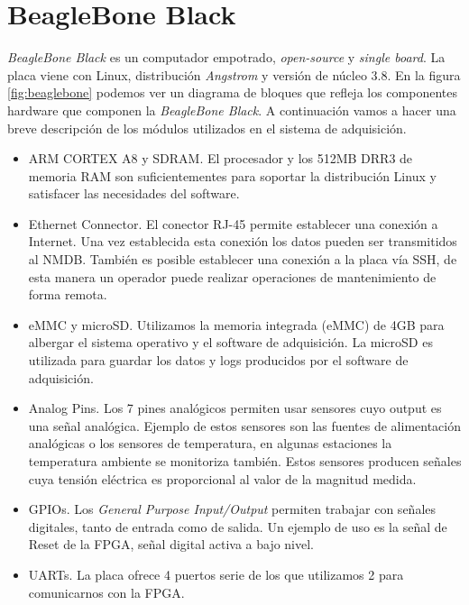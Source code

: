     \section{BeagleBone Black}
        \emph{BeagleBone Black}\cite{Beagle}\cite{BeagleWiki} es un computador
        empotrado, \emph{open-source} y \emph{single board}. La placa viene con
        Linux, distribución \emph{Angstrom} y versión de núcleo 3.8. En la
        figura \ref{fig:beaglebone} podemos ver un diagrama de bloques que
        refleja los componentes hardware que componen la \emph{BeagleBone
        Black}. A continuación vamos a hacer una breve descripción de los
        módulos utilizados en el sistema de adquisición.
        \begin{itemize}
            \item 	ARM CORTEX A8\cite{BeagleCore} y SDRAM. El procesador y los
                512MB DRR3 de memoria RAM son suficientementes para soportar la
                distribución Linux y satisfacer las necesidades del software.
            \item 	Ethernet Connector. El conector RJ-45 permite establecer
                una conexión a Internet. Una vez establecida esta conexión los
                datos pueden ser transmitidos al NMDB. También es posible
                establecer una conexión a la placa vía SSH, de esta manera un
                operador puede realizar operaciones de mantenimiento de forma
                remota.
            \item	eMMC y microSD. Utilizamos la memoria integrada (eMMC) de
                4GB para albergar el sistema operativo y el software de
                adquisición. La microSD es utilizada para guardar los datos y
                logs producidos por el software de adquisición.
            \item 	Analog Pins. Los 7 pines analógicos permiten usar sensores
                cuyo output es una señal analógica. Ejemplo de estos sensores
                son las fuentes de alimentación analógicas o los sensores de
                temperatura, en algunas estaciones la temperatura ambiente se
                monitoriza también. Estos sensores producen señales cuya
                tensión eléctrica es proporcional al valor de la magnitud
                medida. 
            \item 	GPIOs. Los \emph{General Purpose Input/Output} permiten
                trabajar con señales digitales, tanto de entrada como de
                salida. Un ejemplo de uso es la señal de Reset de la FPGA,
                señal digital activa a bajo nivel.
            \item	UARTs. La placa ofrece 4 puertos serie de los que
                utilizamos 2 para comunicarnos con la FPGA.
        \end{itemize}
